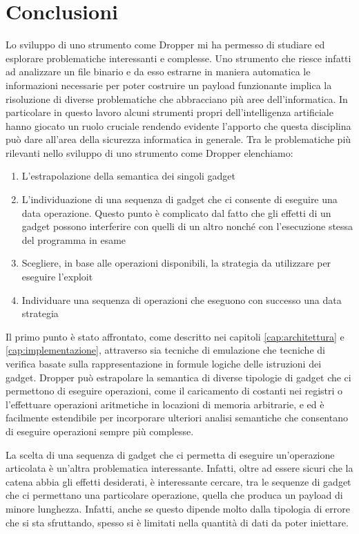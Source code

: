 \chapter{Conclusioni}

Lo sviluppo di uno strumento come Dropper mi ha permesso di studiare
ed esplorare problematiche interessanti e complesse. Uno strumento che
riesce infatti ad analizzare un file binario e da esso estrarne in
maniera automatica le informazioni necessarie per poter costruire un
payload funzionante implica la risoluzione di diverse problematiche
che abbracciano più aree dell'informatica. In particolare in questo
lavoro alcuni strumenti propri dell'intelligenza artificiale hanno
giocato un ruolo cruciale rendendo evidente l'apporto che questa
disciplina può dare all'area della sicurezza informatica in
generale. Tra le problematiche più rilevanti nello sviluppo di uno
strumento come Dropper elenchiamo:

\begin{enumerate}
\item L'estrapolazione della semantica dei singoli gadget
\item L'individuazione di una sequenza di gadget che ci consente di
  eseguire una data operazione. Questo punto è complicato dal fatto che gli
  effetti di un gadget possono interferire con quelli di un altro
  nonché con l'esecuzione stessa del programma in esame
\item Scegliere, in base alle operazioni disponibili, la strategia da
  utilizzare per eseguire l'exploit
\item Individuare una sequenza di operazioni che eseguono con successo
  una data strategia
\end{enumerate}

Il primo punto è stato affrontato, come descritto nei capitoli
\ref{cap:architettura} e \ref{cap:implementazione}, attraverso sia
tecniche di emulazione che tecniche di verifica basate sulla
rappresentazione in formule logiche delle istruzioni dei
gadget. Dropper può estrapolare la semantica di diverse tipologie di
gadget che ci permettono di eseguire operazioni, come il caricamento di
costanti nei registri o l'effettuare operazioni aritmetiche in
locazioni di memoria arbitrarie, e ed è facilmente estendibile per
incorporare ulteriori analisi semantiche che consentano di eseguire
operazioni sempre più complesse.

La scelta di una sequenza di gadget che ci permetta di eseguire
un'operazione articolata è un'altra problematica
interessante. Infatti, oltre ad essere sicuri che la catena abbia gli
effetti desiderati, è interessante cercare, tra le sequenze di gadget
che ci permettano una particolare operazione, quella che produca un
payload di minore lunghezza. Infatti, anche se questo dipende molto
dalla tipologia di errore che si sta sfruttando, spesso si è limitati
nella quantità di dati da poter iniettare.

